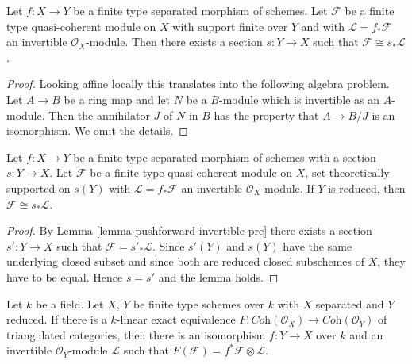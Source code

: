 \begin{lemma}
\label{lemma-pushforward-invertible-pre}
Let $f : X \to Y$ be a finite type separated morphism of schemes. Let
$\mathcal{F}$ be a finite type quasi-coherent module on $X$
with support finite over $Y$
and with $\mathcal{L} = f_*\mathcal{F}$ an invertible $\mathcal{O}_X$-module.
Then there exists a section $s : Y \to X$ such that
$\mathcal{F} \cong s_*\mathcal{L}$.
\end{lemma}

\begin{proof}
Looking affine locally this translates into the following algebra problem.
Let $A \to B$ be a ring map and let $N$ be a $B$-module which is
invertible as an $A$-module. Then the annihilator $J$ of $N$ in $B$
has the property that $A \to B/J$ is an isomorphism. We omit the details.
\end{proof}

\begin{lemma}
\label{lemma-pushforward-invertible}
Let $f : X \to Y$ be a finite type separated morphism of schemes with a section
$s : Y \to X$. Let $\mathcal{F}$ be a finite type quasi-coherent module
on $X$, set theoretically supported on $s(Y)$ with
$\mathcal{L} = f_*\mathcal{F}$
an invertible $\mathcal{O}_X$-module. If $Y$ is reduced, then
$\mathcal{F} \cong s_*\mathcal{L}$.
\end{lemma}

\begin{proof}
By Lemma \ref{lemma-pushforward-invertible-pre}
there exists a section $s' : Y  \to X$ such that
$\mathcal{F} = s'_*\mathcal{L}$. Since $s'(Y)$ and $s(Y)$
have the same underlying closed subset
and since both are reduced closed subschemes of $X$, they have to be equal.
Hence $s = s'$ and the lemma holds.
\end{proof}

\begin{lemma}
\label{lemma-equivalence-coherent-over-field}
Let $k$ be a field. Let $X$, $Y$ be finite type schemes over $k$ with
$X$ separated and $Y$ reduced. If there is a $k$-linear exact equivalence
$F : \textit{Coh}(\mathcal{O}_X) \to \textit{Coh}(\mathcal{O}_Y)$
of triangulated categories, then there is an isomorphism $f : Y \to X$
over $k$ and an invertible $\mathcal{O}_Y$-module $\mathcal{L}$
such that $F(\mathcal{F}) = f^*\mathcal{F} \otimes \mathcal{L}$.
\end{lemma}


